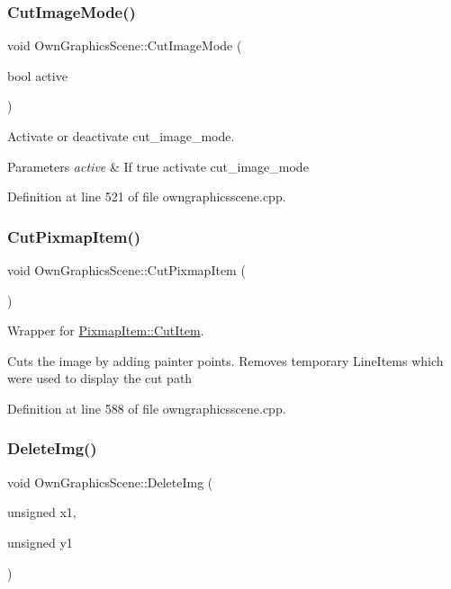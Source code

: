 \subsubsection{\texorpdfstring{Cut\+Image\+Mode()}{CutImageMode()}}
{\footnotesize\ttfamily void Own\+Graphics\+Scene\+::\+Cut\+Image\+Mode (\begin{DoxyParamCaption}\item[{bool}]{active }\end{DoxyParamCaption})}



Activate or deactivate cut\+\_\+image\+\_\+mode. 


\begin{DoxyParams}{Parameters}
{\em active} & If true activate cut\+\_\+image\+\_\+mode \\
\hline
\end{DoxyParams}


Definition at line 521 of file owngraphicsscene.\+cpp.

\mbox{\label{classOwnGraphicsScene_a7e3d97c27cca1df796b75cc4a99e24cd}} 
\subsubsection{\texorpdfstring{Cut\+Pixmap\+Item()}{CutPixmapItem()}}
{\footnotesize\ttfamily void Own\+Graphics\+Scene\+::\+Cut\+Pixmap\+Item (\begin{DoxyParamCaption}{ }\end{DoxyParamCaption})}



Wrapper for \mbox{\hyperlink{classPixmapItem_a4a742318dce01d018da2f4b01790c210}{Pixmap\+Item\+::\+Cut\+Item}}. 

Cuts the image by adding painter points. Removes temporary Line\+Items which were used to display the cut path 

Definition at line 588 of file owngraphicsscene.\+cpp.

\mbox{\label{classOwnGraphicsScene_abda962c04f88920377d3bb23b30b9267}} 
\subsubsection{\texorpdfstring{Delete\+Img()}{DeleteImg()}}
{\footnotesize\ttfamily void Own\+Graphics\+Scene\+::\+Delete\+Img (\begin{DoxyParamCaption}\item[{unsigned}]{x1,  }\item[{unsigned}]{y1 }\end{DoxyParamCaption})}



